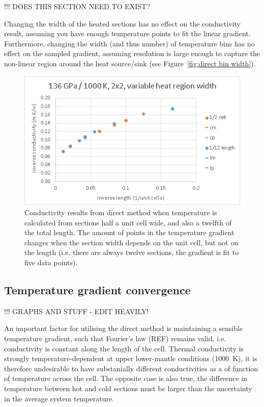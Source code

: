 !!! DOES THIS SECTION NEED TO EXIST?

Changing the width of the heated sections has no effect on the conductivity result, assuming you have enough temperature points to fit the linear gradient. Furthermore, changing the width (and thus number) of temperature bins has no effect on the sampled gradient, assuming resolution is large enough to capture the non-linear region around the heat source/sink (see Figure~\ref{fig:direct bin width}). 

\begin{figure}[h!]
\includegraphics[width=\linewidth]{Figures/direct_bin_width.png}
\caption[direct bin width]{Conductivity results from direct method when temperature is calculated from sections half a unit cell wide, and also a twelfth of the total length. The amount of points in the temperature gradient changes when the section width depends on the unit cell, but not on the length (i.e. there are always twelve sections, the gradient is fit to five data points).}
\label{fig:direct_bin_width}
\end{figure}


\subsection{\label{sec:3.DM.grad}Temperature gradient convergence}

!!! GRAPHS AND STUFF - EDIT HEAVILY!

An important factor for utilising the direct method is maintaining a sensible temperature gradient, such that Fourier's law (REF) remains valid, i.e. conductivity is constant along the length of the cell. Thermal conductivity is strongly temperature-dependent at upper lower-mantle conditions (1000~K), it is therefore undesirable to have substanially different conductivities as a of function of temperature across the cell. The opposite case is also true, the difference in temperature between hot and cold sections must be larger than the uncertainty in the average system temperature. 

